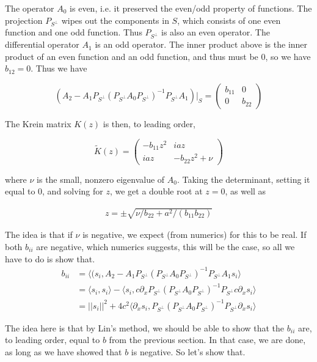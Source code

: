 \documentclass[12pt]{article}
\begin{document}
The operator $A_0$ is even, i.e. it preserved the even/odd property of functions. The projection $P_{S^\perp}$ wipes out the components in $S$, which consists of one even function and one odd function. Thus $P_{S^\perp}$ is also an even operator. The differential operator $A_1$ is an odd operator. The inner product above is the inner product of an even function and an odd function, and thus must be 0, so we have $b_{12} = 0$. Thus we have

\[
\left( A_2 - A_1 P_{S^\perp} (P_{S^\perp} A_0 P_{S^\perp})^{-1} P_{S^\perp} A_1 \right)|_S = \begin{pmatrix} b_{11} & 0 \\ 0 & b_{22} \end{pmatrix}
\]

The Krein matrix $K(z)$ is then, to leading order,

\begin{equation}
\tilde{K}(z) = \begin{pmatrix}
-b_{11} z^2 & i a z \\
i a z & -b_{22} z^2 + \nu
\end{pmatrix}
\end{equation}

where $\nu$ is the small, nonzero eigenvalue of $A_0$. Taking the determinant, setting it equal to 0, and solving for $z$, we get a double root at $z = 0$, as well as

\begin{align*}
z = \pm \sqrt{\nu /b_{22} + a^2/(b_{11} b_{22})}
\end{align*} 

The idea is that if $\nu$ is negative, we expect (from numerics) for this to be real. If both $b_{ii}$ are negative, which numerics suggests, this will be the case, so all we have to do is show that.\\

\begin{align*}
b_{ii} &= \langle(s_i, A_2 - A_1 P_{S^\perp} (P_{S^\perp} A_0 P_{S^\perp})^{-1} P_{S^\perp} A_1 s_i \rangle \\
&= \langle s_i, s_i \rangle - \langle s_i, c \partial_x P_{S^\perp} (P_{S^\perp} A_0 P_{S^\perp})^{-1} P_{S^\perp} c \partial_x  s_i \rangle \\
&= ||s_i||^2 + 4 c^2 \langle \partial_x s_i, P_{S^\perp} (P_{S^\perp} A_0 P_{S^\perp})^{-1} P_{S^\perp} \partial_x s_i \rangle
\end{align*}

The idea here is that by Lin's method, we should be able to show that the $b_{ii}$ are, to leading order, equal to $b$ from the previous section. In that case, we are done, as long as we have showed that $b$ is negative. So let's show that.\\
\end{document}
